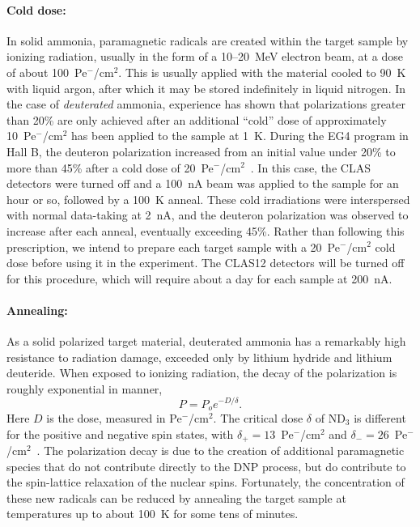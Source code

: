 \vspace{-.15in}
\paragraph{Cold dose:}
In solid ammonia, paramagnetic radicals are created within the target sample by ionizing radiation, usually 
in the form of a 10--20~MeV electron beam, at a dose of about 
100~Pe$^{\minus}$/cm$^2$.
This is usually applied with the material cooled to 90~K with liquid argon, after which it may be stored indefinitely in liquid nitrogen.  
In the case of {\em deuterated\/} ammonia, experience has shown that polarizations greater than 20\% are only achieved after an additional  ``cold'' dose of approximately 10~Pe$^{\minus}$/cm$^2$ 
has been applied to the sample at 1~K.  
During the EG4 program in Hall B, the deuteron polarization increased from an initial value under 20\% to more than 45\%  after a cold dose of  20~Pe$^{\minus}$/cm$^2$~\cite{Slifer2007}.  In this case, the CLAS detectors were turned off and a 100~nA beam was applied to the sample for an hour or so, followed by a 100~K anneal.  These cold irradiations were interspersed with normal data-taking at 2~nA, and the deuteron polarization was observed to increase after each anneal, eventually exceeding 45\%.  Rather than following this prescription, we intend to prepare each target sample with a 20~Pe$^{\minus}$/cm$^2$ cold dose before using it in the experiment.  The CLAS12 detectors will be turned off for this procedure, which will require about a day for each sample at 200~nA. 

\vspace{-.15in}
\paragraph{Annealing:}
As a solid polarized target material, deuterated ammonia has a remarkably high resistance to radiation damage, 
exceeded only by lithium hydride and lithium deuteride.
When exposed to ionizing radiation, the decay of the polarization is roughly exponential in manner,
\begin{equation}
  P = P_o e^{-D/\delta}.
\end{equation}
Here $D$ is the dose, measured in Pe$^{\minus}$/cm$^2$.
The critical dose $\delta$ of ND$_3$ is different for the positive and negative spin states, with
$\delta_{\plus} = 13$~Pe$^{\minus}$/cm$^2$ and
$\delta_{\minus} = 26$~Pe$^{\minus}$/cm$^2$~\cite{Goertz2002}.
The polarization decay is due to the creation of additional paramagnetic species
that do not contribute directly to the DNP process, but do contribute to the spin-lattice 
relaxation of the nuclear spins.
Fortunately, the concentration of these new radicals can be reduced by annealing the target sample at temperatures up to about 100~K for some tens of minutes.

